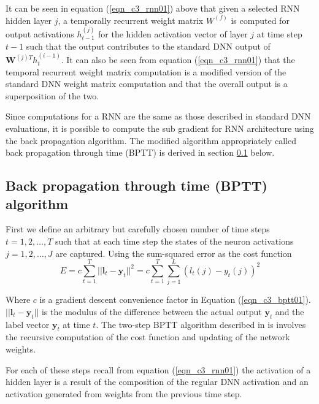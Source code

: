 It can be seen in equation (\ref{eqn_c3_rnn01}) above that given a selected RNN  hidden layer $j$, a temporally recurrent weight matrix $W^{(f)}$ is computed for output activations $h^{(j)}_{t-1}$ for the hidden activation vector of layer $j$ at time step $t - 1$ such that the output contributes to the standard DNN output of  $\mathbf{W}^{(j)T}h_t^{(i-1)}$. It can also be seen from  equation (\ref{eqn_c3_rnn01}) that the temporal recurrent weight matrix computation is a modified version of the standard DNN weight matrix computation and that the overall output is a superposition of the two.

Since computations for a RNN are the same as those described in standard DNN evaluations, it is possible to compute the sub gradient for  RNN architecture using the back propagation algorithm.  The modified algorithm appropriately called back propagation through time (BPTT) \citep{boden2002guide,jaeger2002tutorial} is derived in section \ref{c3_BPTT} below.  

\subsection{Back propagation through time (BPTT) algorithm}\label{c3_BPTT}
First we define an arbitrary but carefully chosen number of time steps $t=1,2,\dots,T$ such that at each time step the states of the neuron activations $j=1,2,\dots,J$ are captured.
Using the sum-squared error as the cost function
\begin{equation}
E=c\sum_{t=1}^T||\mathbf{l}_t-\mathbf{y}_t||^2=c\sum_{t=1}^T\sum_{j=1}^L(l_t(j)-y_t(j))^2 \label{eqn_c3_bptt01}\end{equation}

Where $c$ is a gradient descent convenience factor in Equation (\ref{eqn_c3_bptt01}). $||\mathbf{l}_t-\mathbf{y}_t||$ is the modulus of the difference between the actual output $\mathbf{y}_t$ and the label vector $\mathbf{y}_t$ at time $t$. The two-step BPTT algorithm described in \cite{yu2016automatic} is involves the recursive computation of the cost function and updating of the network weights.

For each of these steps recall from equation (\ref{eqn_c3_rnn01}) the activation of a hidden layer is a result of the composition of the regular DNN activation and an activation generated from weights from the previous time step.

